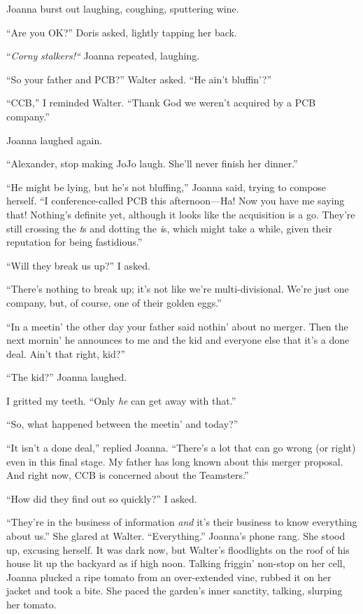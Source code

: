 Joanna burst out laughing, coughing, sputtering wine.

``Are you OK?'' Doris asked, lightly tapping her back.

``\emph{Corny} \emph{stalkers!{}``} Joanna repeated, laughing.

``So your father and PCB?'' Walter asked. ``He ain't bluffin'?''

``CCB,'' I reminded Walter. ``Thank God we weren't acquired by a PCB
company.''

Joanna laughed again.

``Alexander, stop making JoJo laugh. She'll never finish her dinner.''

``He might be lying, but he's not bluffing,'' Joanna said, trying to
compose herself. ``I conference-called PCB this afternoon---Ha! Now you
have me saying that! Nothing's definite yet, although it looks like the
acquisition is a go. They're still crossing the \emph{t}s and dotting
the \emph{i}s, which might take a while, given their reputation for
being fastidious.''

``Will they break us up?'' I asked.

``There's nothing to break up; it's not like we're multi-divisional.
We're just one company, but, of course, one of their golden eggs.''

``In a meetin' the other day your father said nothin' about no merger.
Then the next mornin' he announces to me and the kid and everyone else
that it's a done deal. Ain't that right, kid?''

``The kid?'' Joanna laughed.

I gritted my teeth. ``Only \emph{he} can get away with that.''

``So, what happened between the meetin' and today?''

``It isn't a done deal,'' replied Joanna. ``There's a lot that can go
wrong (or right) even in this final stage. My father has long known
about this merger proposal. And right now, CCB is concerned about the
Teamsters.''

``How did they find out so quickly?'' I asked.

``They're in the business of information \emph{and} it's their business
to know everything about us.'' She glared at Walter. ``Everything.''
Joanna's phone rang. She stood up, excusing herself. It was dark now,
but Walter's floodlights on the roof of his house lit up the backyard as
if high noon. Talking friggin' non-stop on her cell, Joanna plucked a
ripe tomato from an over-extended vine, rubbed it on her jacket and took
a bite. She paced the garden's inner sanctity, talking, slurping her
tomato.

